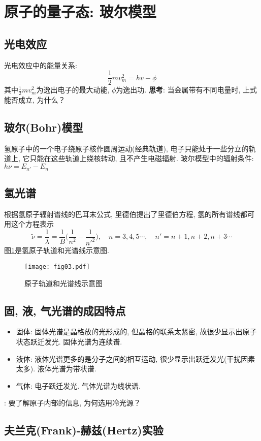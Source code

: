 \section{原子的量子态: 玻尔模型}
\subsection{光电效应}
光电效应中的能量关系: 
\[
\frac{1}{2}mv_m^2=hv-\phi
\]
其中$\frac{1}{2}mv_m^2$为逸出电子的最大动能, $\phi$为逸出功. \textbf{思考}: 当金属带有不同电量时, 上式能否成立, 为什么？

\subsection{玻尔(Bohr)模型}
氢原子中的一个电子绕原子核作圆周运动(经典轨道), 电子只能处于一些分立的轨道上, 它只能在这些轨道上绕核转动, 且不产生电磁辐射. 玻尔模型中的辐射条件:  $h\nu=E_{n'}-E_n$

\subsection{氢光谱}
根据氢原子辐射谱线的巴耳末公式, 里德伯提出了里德伯方程, 氢的所有谱线都可用这个方程表示
\[
\tilde{\nu}=\frac{1}{\lambda}=\frac{1}{B}\Big(\frac{1}{n^2}-\frac{1}{n'^2}\Big),\quad n=3,4,5\cdots,\quad n'=n+1,n+2,n+3\cdots
\]
图\ref{fig03}是氢原子轨道和光谱线示意图.
\begin{figure}[!htb]
\centering
\texttt{[image: fig03.pdf]}
\caption{\label{fig03}原子轨道和光谱线示意图}
\end{figure}


\subsection{固, 液, 气光谱的成因特点}
\begin{itemize}
\item 固体: 固体光谱是晶格放的光形成的, 但晶格的联系太紧密, 故很少显示出原子状态跃迁发光. 固体光谱为连续谱. 
\item 液体: 液体光谱更多的是分子之间的相互运动, 很少显示出跃迁发光(干扰因素太多). 液体光谱为带状谱. 
\item 气体: 电子跃迁发光. 气体光谱为线状谱. 
\end{itemize}
\noindent[\textbf{思考}]: 要了解原子内部的信息, 为何选用冷光源？

\subsection{夫兰克(Frank)-赫兹(Hertz)实验}

